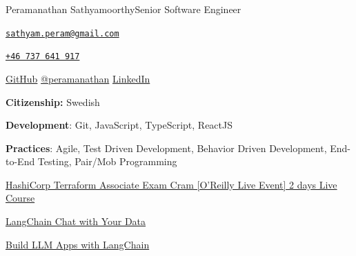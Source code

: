 \documentclass{article}
\begin{document}
\begin{cv}[cvpicture]{Peramanathan Sathyamoorthy}{Senior Software Engineer}
\begin{cvevent}[July 2015][September 2015]
\end{cvevent}

\cvsidebar %



\begin{cvitem}[Envelope][3]
    \href{mailto:sathyam.peram@gmail.com}{\texttt{sathyam.peram@gmail.com}}
\end{cvitem}

\cvseparator[2]
\begin{cvitem}[Phone][3]
    \href{tel:+46737641917}{\texttt{+46~737~641~917}}
\end{cvitem}

\cvseparator[2]
\begin{cvitem}[Link][3]
   \href{https://github.com/p10ns11y}{GitHub}
   \href{https://x.com/peramanathan}{@peramanathan}
   \href{https://linkedin.com/in/sathyam-peram/}{LinkedIn}
\end{cvitem}

\cvseparator[2]
\begin{cvitem}[Shield][3]
    \textbf{Citizenship:}
    Swedish
\end{cvitem}


\textbf{Development}: Git, JavaScript, TypeScript, ReactJS

\vspace{1em}

\textbf{Practices}: Agile, Test Driven Development, Behavior Driven Development, End-to-End Testing, Pair/Mob Programming



{\href{https://github.com/p10ns11y/oreilly-terraform-live-course-sessions}{HashiCorp Terraform Associate Exam Cram [O'Reilly Live Event] 2 days Live Course}}

\vspace{1em}

{\href{https://learn.deeplearning.ai/accomplishments/f72f24f1-9ad2-4bc0-b8c2-33cbecb81ec2}{LangChain Chat with Your Data}}

\vspace{1em}

{\href{https://learn.deeplearning.ai/accomplishments/14907d64-9ff2-4dc7-b5f7-ce42982f8551?usp=sharing}{Build LLM Apps with LangChain}}


\end{cv}
\end{document}
